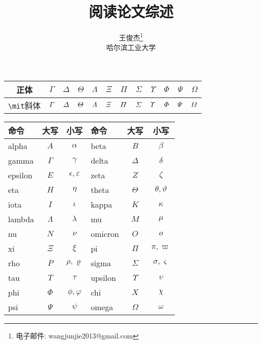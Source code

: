 \documentclass[a4paper, 11pt]{article}
\newcommand{\xiaosihao}{\fontsize{12pt}{\baselineskip}\selectfont}
\begin{document}
\begin{CJK}{UTF8}{gbsn}

\newtheorem{example}{例}             %
\newtheorem{algorithm}{算法}
\newtheorem{theorem}{定理}[section]  %
\newtheorem{definition}{定义}
\newtheorem{axiom}{公理}
\newtheorem{property}{性质}
\newtheorem{proposition}{命题}
\newtheorem{lemma}{引理}
\newtheorem{corollary}{推论}
\newtheorem{remark}{注解}
\newtheorem{condition}{条件}
\newtheorem{conclusion}{结论}
\newtheorem{assumption}{假设}




\title{ 阅读论文综述}
\author{王俊杰\footnote{电子邮件: wangjunjie2013@gmail.com}\\[2ex]
\xiaosihao 哈尔滨工业大学\\[2ex]
}
\date{}


\maketitle


 \begin{tabular}{|c|ccccccccccc|}
\hline
正体&$\Gamma$ & $\Delta$ & $\Theta$ & $\Lambda$ & $\Xi$ & $\Pi$ & $\Sigma$ & $\Upsilon$ & $\Phi$ & $\Psi$ & $\Omega$\\
\hline
\verb|\mit|斜体&$\mit\Gamma$ & $\mit\Delta$ & $\mit\Theta$ & $\mit\Lambda$ & $\mit\Xi$ & $\mit\Pi$ & $\mit\Sigma$ &  $\mit\Upsilon$ & $\mit\Phi$ & $\mit\Psi$ & $\mit\Omega$\\
\hline
\end{tabular}


 \begin{tabular}{|lcc|lcc|}
\hline
命令 & 大写 & 小写 & 命令 & 大写 & 小写 \\
\hline
  alpha & $A$ & $\alpha$ &  beta & $B$ &$\beta$  \\
  gamma & $\Gamma$ & $\gamma$  &  delta & $\Delta$ & $\delta$ \\
  epsilon & $E$ & $\epsilon,\varepsilon$ &  zeta & $Z$ & $\zeta$ \\
   eta & $H$ &$\eta$  &  theta & $\Theta$ & $\theta,\vartheta$ \\
  iota & $I$ & $\iota$ &   kappa & $K$ & $\kappa$ \\
  lambda & $\Lambda$ & $\lambda$  & mu & $M$ & $\mu$ \\
  nu & $N$ & $\nu$ & omicron & $O$ & $o$ \\
    xi & $\Xi$ & $\xi$  &   pi & $\Pi$ & $\pi,\varpi$ \\
    rho & $P$ & $\rho,\varrho$  &  sigma & $\Sigma$ & $\sigma,\varsigma$ \\
   tau & $T$ & $\tau$ &   upsilon & $\Upsilon$ & $\upsilon$ \\
  phi & $\Phi$ & $\phi,\varphi$ &  chi & $X$ & $\chi$ \\
  psi & $\Psi$ & $\psi$  &  omega & $\Omega$ &$\omega$ \\
\hline
\end{tabular}



\end{CJK}
\end{document}
